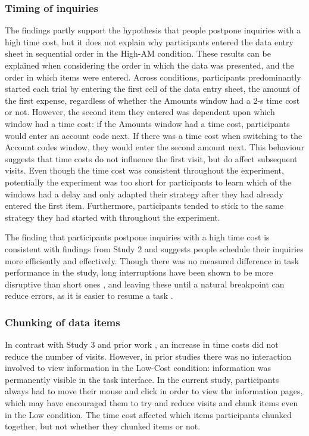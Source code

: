 \subsubsection{Timing of inquiries}
The findings partly support the hypothesis that people postpone inquiries with a high time cost, but it does not explain why participants entered the data entry sheet in sequential order in the High-AM condition. 
These results can be explained when considering the order in which the data was presented, and the order in which items were entered. Across conditions, participants predominantly started each trial by entering the first cell of the data entry sheet, the amount of the first expense, regardless of whether the Amounts window had a 2-s time cost or not. However, the second item they entered was dependent upon which window had a time cost: if the Amounts window had a time cost, participants would enter an account code next. If there was a time cost when switching to the Account codes window, they would enter the second amount next.
This behaviour suggests that time costs do not influence the first visit, but do affect subsequent visits. Even though the time cost was consistent throughout the experiment, potentially the experiment was too short for participants to learn which of the windows had a delay and only adapted their strategy after they had already entered the first item. Furthermore, participants tended to stick to the same strategy they had started with throughout the experiment.

The finding that participants postpone inquiries with a high time cost is consistent with findings from Study 2 and suggests people schedule their inquiries more efficiently and effectively. Though there was no measured difference in task performance in the study, long interruptions have been shown to be more disruptive than short ones \citep{Altmann2017, Monk2008}, and leaving these until a natural breakpoint can reduce errors, as it is easier to resume a task \citep{Gould2013a, Iqbal2005}.

\subsubsection{Chunking of data items}
In contrast with Study 3 and prior work \citep{Gray2006}, an increase in time costs did not reduce the number of visits. However, in prior studies there was no interaction involved to view information in the Low-Cost condition: information was permanently visible in the task interface. In the current study, participants always had to move their mouse and click in order to view the information pages, which may have encouraged them to try and reduce visits and chunk items even in the Low condition. The time cost affected which items participants chunked together, but not whether they chunked items or not.

